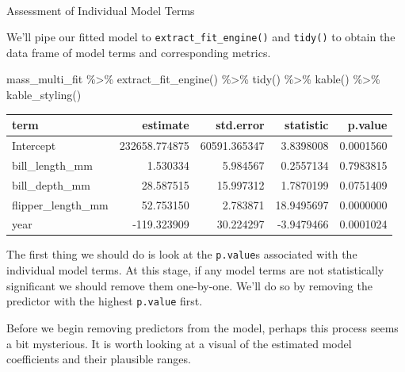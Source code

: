 \documentclass[
  letterpaper,
  DIV=11,
  numbers=noendperiod]{scrartcl}
\makeatletter
\let\oldparagraph\paragraph
\renewcommand{\paragraph}{
    \@ifstar
      \xxxParagraphStar
      \xxxParagraphNoStar
  }
\newcommand{\xxxParagraphStar}[1]{\oldparagraph*{#1}\mbox{}}
\newcommand{\xxxParagraphNoStar}[1]{\oldparagraph{#1}\mbox{}}
\newenvironment{Shaded}{\begin{snugshade}}{\end{snugshade}}
\newcommand{\FunctionTok}[1]{\textcolor[rgb]{0.28,0.35,0.67}{#1}}
\newcommand{\NormalTok}[1]{\textcolor[rgb]{0.00,0.23,0.31}{#1}}
\newcommand{\SpecialCharTok}[1]{\textcolor[rgb]{0.37,0.37,0.37}{#1}}
\makeatother
\begin{document}
\paragraph{Assessment of Individual Model
Terms}\label{assessment-of-individual-model-terms}

We'll pipe our fitted model to \texttt{extract\_fit\_engine()} and
\texttt{tidy()} to obtain the data frame of model terms and
corresponding metrics.

\begin{Shaded}
\begin{Highlighting}[]
\NormalTok{mass\_multi\_fit }\SpecialCharTok{\%\textgreater{}\%}
  \FunctionTok{extract\_fit\_engine}\NormalTok{() }\SpecialCharTok{\%\textgreater{}\%}
  \FunctionTok{tidy}\NormalTok{() }\SpecialCharTok{\%\textgreater{}\%}
  \FunctionTok{kable}\NormalTok{() }\SpecialCharTok{\%\textgreater{}\%}
  \FunctionTok{kable\_styling}\NormalTok{()}
\end{Highlighting}
\end{Shaded}

\begin{longtable}[t]{lrrrr}
\toprule
term & estimate & std.error & statistic & p.value\\
\midrule
Intercept & 232658.774875 & 60591.365347 & 3.8398008 & 0.0001560\\
bill\_length\_mm & 1.530334 & 5.984567 & 0.2557134 & 0.7983815\\
bill\_depth\_mm & 28.587515 & 15.997312 & 1.7870199 & 0.0751409\\
flipper\_length\_mm & 52.753150 & 2.783871 & 18.9495697 & 0.0000000\\
year & -119.323909 & 30.224297 & -3.9479466 & 0.0001024\\
\bottomrule
\end{longtable}

The first thing we should do is look at the \texttt{p.value}s associated
with the individual model terms. At this stage, if any model terms are
not statistically significant we should remove them one-by-one. We'll do
so by removing the predictor with the highest \texttt{p.value} first.

Before we begin removing predictors from the model, perhaps this process
seems a bit mysterious. It is worth looking at a visual of the estimated
model coefficients and their plausible ranges.
\end{document}
